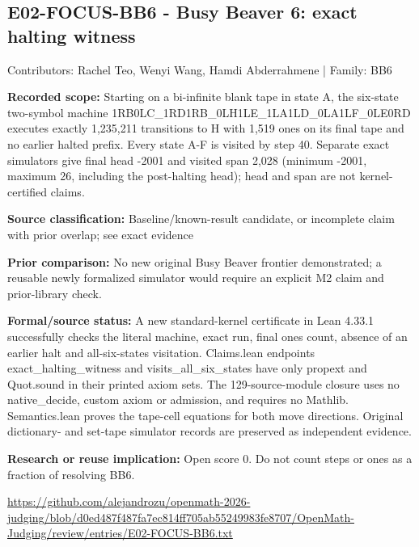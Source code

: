 \documentclass[11pt,a4paper]{article}
\begin{document}
\begin{samepage}
\subsection{E02-FOCUS-BB6  -  Busy Beaver 6: exact halting witness}
{\small Contributors: Rachel Teo, Wenyi Wang, Hamdi Abderrahmene | Family: BB6\par}

\textbf{Recorded scope:} Starting on a bi-infinite blank tape in state A, the six-state two-symbol machine 1RB0LC\_1RD1RB\_0LH1LE\_1LA1LD\_0LA1LF\_0LE0RD executes exactly 1,235,211 transitions to H with 1,519 ones on its final tape and no earlier halted prefix. Every state A-F is visited by step 40. Separate exact simulators give final head -2001 and visited span 2,028 (minimum -2001, maximum 26, including the post-halting head); head and span are not kernel-certified claims.

\textbf{Source classification:} Baseline/known-result candidate, or incomplete claim with prior overlap; see exact evidence

\textbf{Prior comparison:} No new original Busy Beaver frontier demonstrated; a reusable newly formalized simulator would require an explicit M2 claim and prior-library check.

\textbf{Formal/source status:} A new standard-kernel certificate in Lean 4.33.1 successfully checks the literal machine, exact run, final ones count, absence of an earlier halt and all-six-states visitation. Claims.lean endpoints exact\_halting\_witness and visits\_all\_six\_states have only propext and Quot.sound in their printed axiom sets. The 129-source-module closure uses no native\_decide, custom axiom or admission, and requires no Mathlib. Semantics.lean proves the tape-cell equations for both move directions. Original dictionary- and set-tape simulator records are preserved as independent evidence.

\textbf{Research or reuse implication:} Open score 0. Do not count steps or ones as a fraction of resolving BB6.

{\small \url{https://github.com/alejandrozu/openmath-2026-judging/blob/d0ed487f487fa7ec814ff705ab55249983fe8707/OpenMath-Judging/review/entries/E02-FOCUS-BB6.txt}\par}

\end{samepage}
\end{document}
